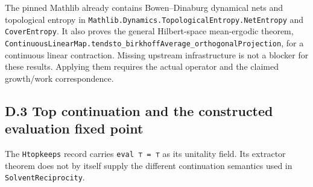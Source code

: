 \documentclass[
]{article}
\begin{document}
The pinned Mathlib already contains Bowen--Dinaburg dynamical nets and
topological entropy in
\texttt{M\allowbreak{}a\allowbreak{}t\allowbreak{}h\allowbreak{}l\allowbreak{}i\allowbreak{}b\allowbreak{}.\allowbreak{}D\allowbreak{}y\allowbreak{}n\allowbreak{}a\allowbreak{}m\allowbreak{}i\allowbreak{}c\allowbreak{}s\allowbreak{}.\allowbreak{}T\allowbreak{}o\allowbreak{}p\allowbreak{}o\allowbreak{}l\allowbreak{}o\allowbreak{}g\allowbreak{}i\allowbreak{}c\allowbreak{}a\allowbreak{}l\allowbreak{}E\allowbreak{}n\allowbreak{}t\allowbreak{}r\allowbreak{}o\allowbreak{}p\allowbreak{}y\allowbreak{}.\allowbreak{}N\allowbreak{}e\allowbreak{}t\allowbreak{}E\allowbreak{}n\allowbreak{}t\allowbreak{}r\allowbreak{}o\allowbreak{}p\allowbreak{}y}
and \texttt{CoverEntropy}. It also proves the general Hilbert-space
mean-ergodic theorem,
\texttt{C\allowbreak{}o\allowbreak{}n\allowbreak{}t\allowbreak{}i\allowbreak{}n\allowbreak{}u\allowbreak{}o\allowbreak{}u\allowbreak{}s\allowbreak{}L\allowbreak{}i\allowbreak{}n\allowbreak{}e\allowbreak{}a\allowbreak{}r\allowbreak{}M\allowbreak{}a\allowbreak{}p\allowbreak{}.\allowbreak{}t\allowbreak{}e\allowbreak{}n\allowbreak{}d\allowbreak{}s\allowbreak{}t\allowbreak{}o\allowbreak{}\_\allowbreak{}b\allowbreak{}i\allowbreak{}r\allowbreak{}k\allowbreak{}h\allowbreak{}o\allowbreak{}f\allowbreak{}f\allowbreak{}A\allowbreak{}v\allowbreak{}e\allowbreak{}r\allowbreak{}a\allowbreak{}g\allowbreak{}e\allowbreak{}\_\allowbreak{}o\allowbreak{}r\allowbreak{}t\allowbreak{}h\allowbreak{}o\allowbreak{}g\allowbreak{}o\allowbreak{}n\allowbreak{}a\allowbreak{}l\allowbreak{}P\allowbreak{}r\allowbreak{}o\allowbreak{}j\allowbreak{}e\allowbreak{}c\allowbreak{}t\allowbreak{}i\allowbreak{}o\allowbreak{}n},
for a continuous linear contraction. Missing upstream infrastructure is
not a blocker for these results. Applying them requires the actual
operator and the claimed growth/work correspondence.

\subsection{D.3 Top continuation and the constructed evaluation fixed
point}\label{d.3-top-continuation-and-the-constructed-evaluation-fixed-point}

The \texttt{Htopkeeps} record carries \texttt{eval\ ⊤\ =\ ⊤} as its
unitality field. Its extractor theorem does not by itself supply the
different continuation semantics used in
\texttt{S\allowbreak{}o\allowbreak{}l\allowbreak{}v\allowbreak{}e\allowbreak{}n\allowbreak{}t\allowbreak{}R\allowbreak{}e\allowbreak{}c\allowbreak{}i\allowbreak{}p\allowbreak{}r\allowbreak{}o\allowbreak{}c\allowbreak{}i\allowbreak{}t\allowbreak{}y}.
\end{document}
